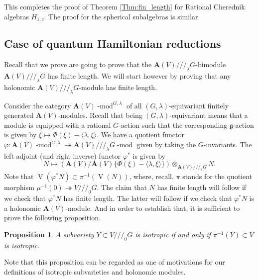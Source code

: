 \documentclass[12pt]{amsart}
\newcommand{\VA}{\operatorname{V}}
\newcommand{\Weyl}{\mathbf{A}}
\newcommand{\g}{\mathfrak{g}}
\newcommand{\red}{/\!/\!/}
\newtheorem{Prop}[Thm]{Proposition}
\theoremstyle{definition}
\begin{document}
This completes the proof of Theorem \ref{Thm:fin_length} for Rational Cherednik algebras $H_{1,c}$.
The proof for the spherical subalgebras is similar.

\subsection{Case of quantum Hamiltonian reductions}\label{SS_red_fin}
Recall that we prove are going to prove that the $\Weyl(V)\red_\lambda G$-bimodule $\Weyl(V)\red_\lambda G$
has finite length. We will start however by proving that
any holonomic $\Weyl(V)\red_\lambda G$-module has finite length.

Consider the category $\Weyl(V)\operatorname{-mod}^{G,\lambda}$ of all $(G,\lambda)$-equivariant
finitely generated $\Weyl(V)$-modules. Recall that being $(G,\lambda)$-equivariant means
that a module is equipped with a rational $G$-action such that the corresponding
$\g$-action is given by $\xi\mapsto \Phi(\xi)-\langle\lambda,\xi\rangle$. We have a quotient functor $\varphi:
\Weyl(V)\operatorname{-mod}^{G,\lambda}\twoheadrightarrow
\Weyl(V)\red_\lambda G\operatorname{-mod}$ given by taking the
$G$-invariants. The left adjoint (and right inverse) functor
$\varphi^*$ is given by
$$N\mapsto (\Weyl(V)/\Weyl(V)\{\Phi(\xi)-\langle \lambda,\xi\rangle\})\otimes_{\Weyl(V)\red_\lambda G}N.$$
Note that $\VA(\varphi^* N)\subset \pi^{-1}(\VA(N))$, where, recall, $\pi$ stands for the quotient
morphism $\mu^{-1}(0)\twoheadrightarrow V\red_0 G$. The claim that $N$ has finite length will follow
if we check that $\varphi^* N$ has finite length. The latter will follow if we check that
$\varphi^* N$ is a holonomic $\Weyl(V)$-module. And in order to establish that, it is sufficient
to prove the following proposition.

\begin{Prop}\label{Prop:isotr_red}
A subvariety $Y\subset V\red_0 G$ is isotropic if and only if $\pi^{-1}(Y)\subset V$ is isotropic.
\end{Prop}
Note that this proposition can be regarded as one of motivations for our definitions of isotropic
subvarieties and holonomic modules.
\end{document}
